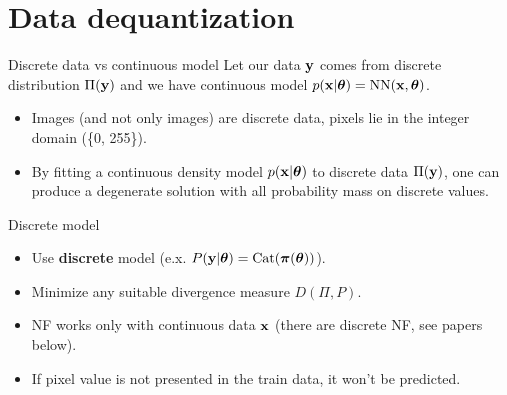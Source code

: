 \section{Data dequantization}
\begin{frame}{Discrete data vs continuous model}
	Let our data $\mathbf{y}$ comes from discrete distribution $\Pi(\mathbf{y})$ and we have continuous model $p(\mathbf{x} | \boldsymbol{\theta}) = \text{NN}(\mathbf{x}, \boldsymbol{\theta})$.
	\begin{itemize}
		\item Images {\color{gray}(and not only images)} are discrete data, pixels lie in the integer domain (\{0, 255\}). 
		\item By fitting a continuous density model $p(\mathbf{x} | \boldsymbol{\theta})$ to discrete data $\Pi(\mathbf{y})$, one can produce a degenerate solution with all probability mass on discrete values. 
	\end{itemize}
	\begin{block}{Discrete model}
		\begin{itemize}
			\item Use \textbf{discrete} model (e.x. $P(\mathbf{y} | \boldsymbol{\theta}) = \text{Cat}(\boldsymbol{\pi}(\boldsymbol{\theta}))$). 
			\item Minimize any suitable divergence measure $D(\Pi, P)$.
			\item NF works only with continuous data $\mathbf{x}$ (there are discrete NF, see papers below).
			\item If pixel value is not presented in the train data, it won't be predicted.		
		\end{itemize}
	\end{block}
\end{frame}
